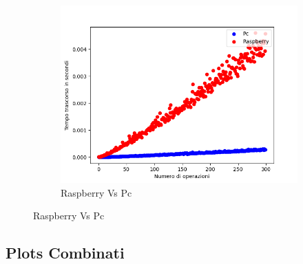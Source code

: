 \documentclass{article}
\begin{document}
\begin{figure}[h!]
\begin{subfigure}{0.6\textwidth}
					\includegraphics[width = \textwidth]{./Plots/PcVsRaspberry_QuickSort.png}
					\caption{Raspberry Vs Pc}
				\end{subfigure}
				
			\end{figure}
		
		\clearpage
		\subsection{Plots Combinati}
		
\end{document}
